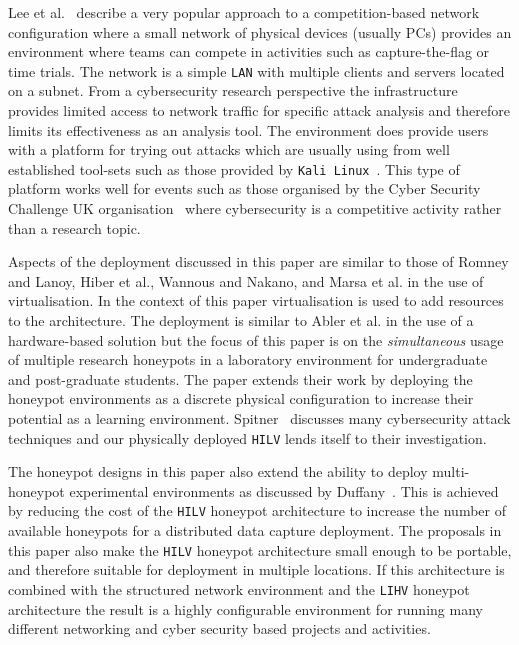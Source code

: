 \documentclass[10pt,journal]{IEEEtran}
\begin{document}
Lee et al.~\cite{LUFC:11} describe a very popular approach to a competition-based network configuration where a small network of physical devices (usually PCs) provides an environment where teams can compete in activities such as capture-the-flag or time trials. The network is a simple \texttt{LAN} with multiple clients and servers located on a subnet. From a cybersecurity research perspective the infrastructure provides limited access to network traffic for specific attack analysis and therefore limits its effectiveness as an analysis tool. The environment does provide users with a platform for trying out attacks which are usually using from well established tool-sets such as those provided by \texttt{Kali Linux}~\cite{OS:17}. This type of platform works well for events such as those organised by the Cyber Security Challenge UK organisation~\cite{CSCUK:18} where cybersecurity is a competitive activity rather than a research topic.   

Aspects of the deployment discussed in this paper are similar to those of Romney and Lanoy, Hiber et al., Wannous and Nakano, and Marsa et al. in the use of virtualisation. In the context of this paper virtualisation is used to add resources to the architecture. The deployment is similar to Abler et al. in the use of a hardware-based solution but the focus of this paper is on the \textit{simultaneous} usage of multiple research honeypots in a laboratory environment for undergraduate and post-graduate students. The paper extends their work by deploying the honeypot environments as a discrete physical configuration to increase their potential as a learning environment. Spitner~\cite{LS:03} discusses many cybersecurity attack techniques and our physically deployed \texttt{HILV} lends itself to their investigation. 

The honeypot designs in this paper also extend the ability to deploy multi-honeypot
experimental environments as discussed by Duffany~\cite{JD:08}. This is
achieved by reducing the cost of the \texttt{HILV} honeypot architecture to increase the
number of available honeypots for a distributed data capture deployment. The
proposals in this paper also make the \texttt{HILV} honeypot architecture small
enough to be portable, and therefore suitable for deployment in 
multiple locations. If this architecture is combined with the structured network environment and the \texttt{LIHV} honeypot architecture the result is a highly configurable environment for running many different networking and cyber security based projects and activities.
\end{document}
